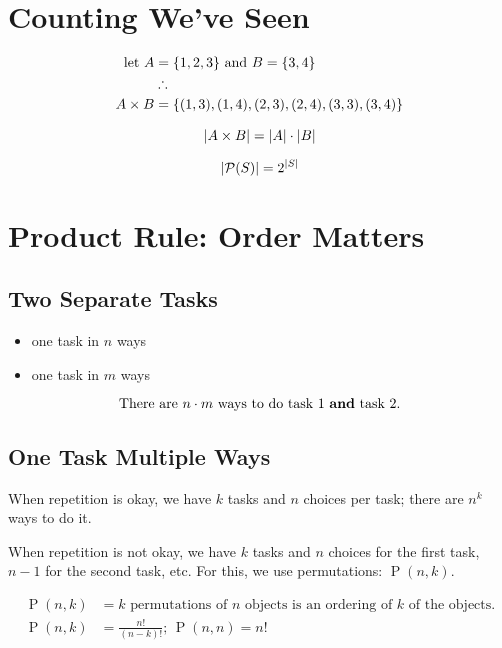 \documentclass{report}
\DeclarePairedDelimiter{\card}{\lvert}{\rvert}
\DeclarePairedDelimiter{\makeset}{\{}{\}}
\DeclareMathOperator{\perm}{P}
\newcommand{\powerset}{\mathcal{P}}
\begin{document}
\section{Counting We've Seen}

\begin{align*}
    \text{let } A &= \makeset{1, 2, 3} \text{ and } B = \makeset{3, 4}
    \\ &\therefore \\
    A \times B &= \makeset{(1, 3), (1, 4), (2, 3), (2, 4), (3, 3), (3, 4)}
\end{align*}


\begin{equation}
    \card{A \times B} = \card{A} \cdot \card{B}
\end{equation}

\begin{equation}
    \card{\powerset(S)} = 2^{\card{S}}
\end{equation}

\section{Product Rule: Order Matters}

\subsection{Two Separate Tasks}
\begin{itemize}
    \item one task in $n$ ways
    \item one task in $m$ ways
\end{itemize}

\begin{equation}
    \text{There are } n \cdot m \text{ ways to do task 1 \textbf{and} task 2.}
\end{equation}

\subsection{One Task Multiple Ways}
When repetition is okay, we have $k$ tasks and $n$ choices per task; there are $n^k$ ways to do it.

When repetition is not okay, we have $k$ tasks and $n$ choices for the first task, $n-1$ for the second task, etc. For this, we use permutations: $\perm(n, k)$.

\begin{align}
    \text{$\perm(n, k)$} &= \text{$k$ permutations of $n$ objects is an ordering of $k$ of the objects.} \\
    \perm(n, k) &= \frac{n!}{(n-k)!} \text{; } \perm(n, n) = n!
\end{align}
\end{document}
